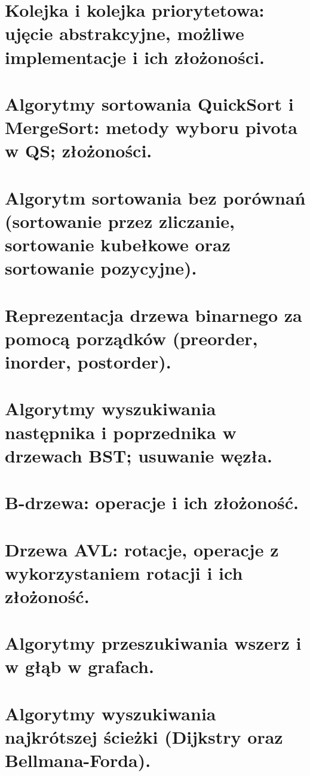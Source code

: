 \documentclass[12pt]{article}
\begin{document}
    \section{Kolejka i kolejka priorytetowa: ujęcie abstrakcyjne, możliwe implementacje i ich złożoności.}

    \newpage

    \section{Algorytmy sortowania QuickSort i MergeSort: metody wyboru pivota w QS; złożoności.}

    \newpage

    \section{Algorytm sortowania bez porównań (sortowanie przez zliczanie, sortowanie kubełkowe oraz sortowanie pozycyjne).}

    \newpage

    \section{Reprezentacja drzewa binarnego za pomocą porządków (preorder, inorder, postorder).}

    \newpage

    \section{Algorytmy wyszukiwania następnika i poprzednika w drzewach BST; usuwanie węzła.}
    \section{B-drzewa: operacje i ich złożoność.}
    \section{Drzewa AVL: rotacje, operacje z wykorzystaniem rotacji i ich złożoność.}
    \section{Algorytmy przeszukiwania wszerz i w głąb w grafach.}
    \section{Algorytmy wyszukiwania najkrótszej ścieżki (Dijkstry oraz Bellmana-Forda).}
\end{document}
